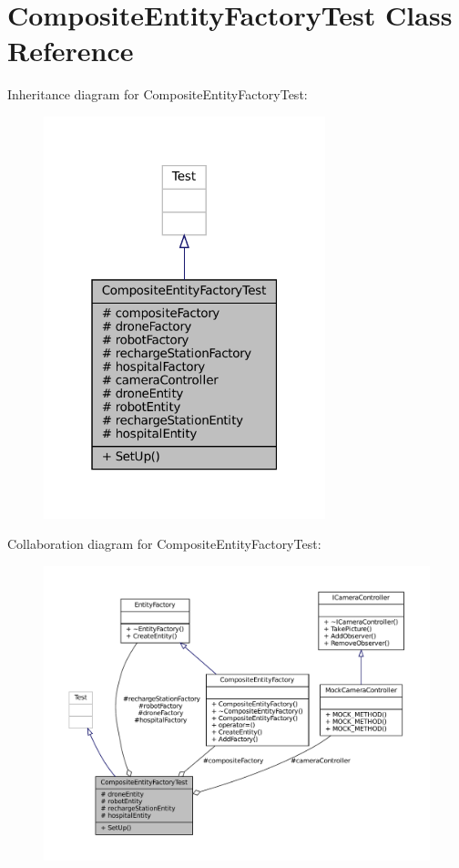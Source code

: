 \hypertarget{classCompositeEntityFactoryTest}{}\section{Composite\+Entity\+Factory\+Test Class Reference}
\label{classCompositeEntityFactoryTest}


Inheritance diagram for Composite\+Entity\+Factory\+Test\+:
\nopagebreak
\begin{figure}[H]
\begin{center}
\leavevmode
\includegraphics[width=232pt]{classCompositeEntityFactoryTest__inherit__graph}
\end{center}
\end{figure}


Collaboration diagram for Composite\+Entity\+Factory\+Test\+:
\nopagebreak
\begin{figure}[H]
\begin{center}
\leavevmode
\includegraphics[width=350pt]{classCompositeEntityFactoryTest__coll__graph}
\end{center}
\end{figure}
